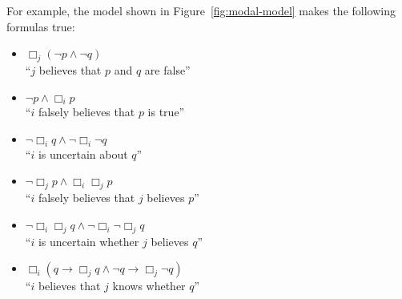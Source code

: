 \documentclass[nobib,nofonts]{tufte-handout}
\newcommand{\ra}{\ensuremath{\rightarrow}}
\newcommand{\Bel}{\ensuremath{\Box}}
\newcommand{\Model}{\ensuremath{\mathcal{M}}}
\begin{document}
For example, the model shown in Figure~\ref{fig:modal-model} makes the following formulas true:
\begin{itemize}[]
  \item $\Bel_j (\neg p \wedge \neg q)$  \\ ``$j$ believes that $p$ and $q$ are false''
  \item $\neg p \wedge \Bel_i p$  \\ ``$i$ falsely believes that $p$ is true''
  \item $\neg \Bel_i q \wedge \neg \Bel_i \neg q$ \\ ``$i$ is uncertain about $q$''
  \item $\neg \Bel_j p \wedge \Bel_i \Bel_j p$ \\ ``$i$ falsely believes that $j$ believes $p$''
  \item $\neg \Bel_i \Bel_j q \wedge \neg \Bel_i \neg \Bel_j q$ \\ ``$i$ is uncertain whether $j$ believes $q$''
  \item $\Bel_i (q \ra \Bel_j q \wedge \neg q \ra \Bel_j \neg q)$ \\ ``$i$ believes that $j$ knows whether $q$''
\end{itemize}


  
\newpage




\end{document}
